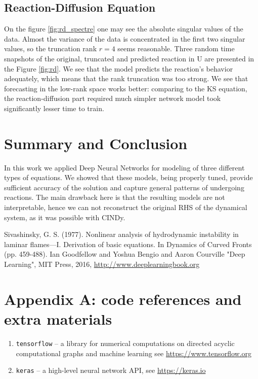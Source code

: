 \documentclass{article}
\begin{document}
    \subsection{Reaction-Diffusion Equation} 
    On the figure \ref{fig:rd_spectre} one may see the absolute singular values of the data. Almost the variance of the data is concentrated in the first two singular values, so the truncation rank $r  = 4$ seems reasonable. Three random time snapshots of the original, truncated and predicted reaction in U are presented in the Figure \ref{fig:rd}. We see that the model predicts the reaction's behavior adequately, which means that the rank truncation was too strong. We see that forecasting in the low-rank space works better: comparing to the KS equation, the reaction-diffusion part required much simpler network model took significantly lesser time to train.     

\section{Summary and Conclusion}
    In this work we applied Deep Neural Networks for modeling of three different types of equations. We showed that these models, being properly tuned, provide sufficient accuracy of the solution and capture general patterns of undergoing reactions. The main drawback here is that the resulting models are not interpretable, hence we can not reconstruct the original RHS of the dynamical system, as it was possible with CINDy. 


\begin{thebibliography}{99}

 Sivashinsky, G. S. (1977). Nonlinear analysis of hydrodynamic instability in laminar flames—I. Derivation of basic equations. In Dynamics of Curved Fronts (pp. 459-488).
Ian Goodfellow and Yoshua Bengio and Aaron Courville "Deep Learning", MIT Press, 2016, \url{http://www.deeplearningbook.org}
\end{thebibliography}

\newpage
\section{Appendix A: code references and extra materials}
\begin{enumerate}
    \item \texttt{tensorflow} -- a library for numerical computations on directed acyclic computational graphs and machine learning see \url{https://www.tensorflow.org}
    \item \texttt{keras} -- a high-level neural network API, see \url{https://keras.io}
\end{enumerate}
\end{document}
